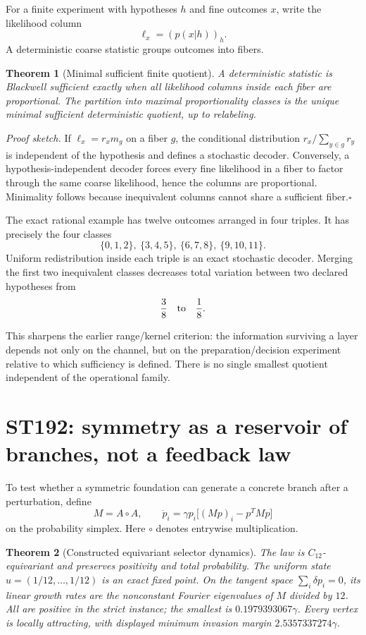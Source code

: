 \documentclass[11pt,a4paper]{article}
\newtheorem{theorem}{Theorem}[section]
\begin{document}
For a finite experiment with hypotheses $h$ and fine outcomes $x$, write the likelihood column
\[
\ell_x=(p(x|h))_h.
\]
A deterministic coarse statistic groups outcomes into fibers.

\begin{theorem}[Minimal sufficient finite quotient]
A deterministic statistic is Blackwell sufficient exactly when all likelihood columns inside each fiber are proportional. The partition into maximal proportionality classes is the unique minimal sufficient deterministic quotient, up to relabeling.
\end{theorem}

\emph{Proof sketch.} If $\ell_x=r_xm_g$ on a fiber $g$, the conditional distribution $r_x/\sum_{y\in g}r_y$ is independent of the hypothesis and defines a stochastic decoder. Conversely, a hypothesis-independent decoder forces every fine likelihood in a fiber to factor through the same coarse likelihood, hence the columns are proportional. Minimality follows because inequivalent columns cannot share a sufficient fiber.\hfill$\square$

The exact rational example has twelve outcomes arranged in four triples. It has precisely the four classes
\[
\{0,1,2\},\ \{3,4,5\},\ \{6,7,8\},\ \{9,10,11\}.
\]
Uniform redistribution inside each triple is an exact stochastic decoder. Merging the first two inequivalent classes decreases total variation between two declared hypotheses from
\[
\frac38\quad\hbox{to}\quad\frac18.
\]

This sharpens the earlier range/kernel criterion: the information surviving a layer depends not only on the channel, but on the preparation/decision experiment relative to which sufficiency is defined. There is no single smallest quotient independent of the operational family.

\section{ST192: symmetry as a reservoir of branches, not a feedback law}

To test whether a symmetric foundation can generate a concrete branch after a perturbation, define
\[
M=A\circ A,
\qquad
\dot p_i=\gamma p_i\bigl[(Mp)_i-p^TMp\bigr]
\]
on the probability simplex. Here $\circ$ denotes entrywise multiplication.

\begin{theorem}[Constructed equivariant selector dynamics]
The law is $C_{12}$-equivariant and preserves positivity and total probability. The uniform state $u=(1/12,\ldots,1/12)$ is an exact fixed point. On the tangent space $\sum_i\delta p_i=0$, its linear growth rates are the nonconstant Fourier eigenvalues of $M$ divided by $12$. All are positive in the strict instance; the smallest is $0.1979393067\gamma$. Every vertex is locally attracting, with displayed minimum invasion margin $2.5357337274\gamma$.
\end{theorem}
\end{document}

